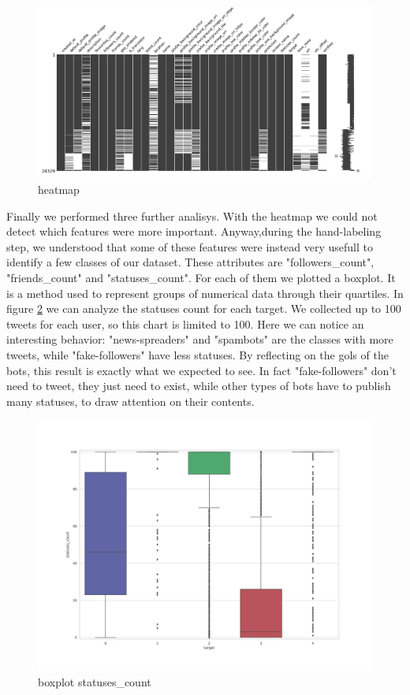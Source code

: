 \begin{figure}
	\centering
	\includegraphics[width=\columnwidth]{chapter3/figure/msno.png}
	\caption{heatmap}
	\label{fig:msno}
\end{figure}

\newpage
Finally we performed three further analisys. With the heatmap we could not detect which features were more important. Anyway,during the hand-labeling step, we understood that some of these features were instead very usefull to identify a few classes of our dataset. These attributes are "followers\_count", "friends\_count" and "statuses\_count". For each of them we plotted a boxplot. It is a method used to represent groups of numerical data through their quartiles. In figure \ref{fig:box_statuses} we can analyze the statuses count for each target. We collected up to 100 tweets for each user, so this chart is limited to 100. Here we can notice an interesting behavior: "news-spreaders" and "spambots" are the classes with more tweets, while "fake-followers" have less statuses. By reflecting on the gols of the bots, this result is exactly what we expected to see. In fact "fake-followers" don't need to tweet, they just need to exist, while other types of bots have to publish many statuses, to draw attention on their contents.

\begin{figure}
	\centering
	\includegraphics[width=\columnwidth]{chapter3/figure/boxplot_statuses.jpg}
	\caption{boxplot statuses\_count}
	\label{fig:box_statuses}
\end{figure}
\newpage


